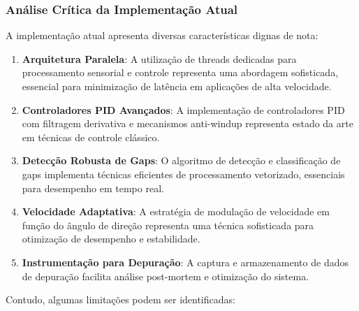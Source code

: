 \subsubsection{Análise Crítica da Implementação Atual}

A implementação atual apresenta diversas características dignas de nota:

\begin{enumerate}
    \item \textbf{Arquitetura Paralela}: A utilização de threads dedicadas para processamento sensorial e controle representa uma abordagem sofisticada, essencial para minimização de latência em aplicações de alta velocidade.

    \item \textbf{Controladores PID Avançados}: A implementação de controladores PID com filtragem derivativa e mecanismos anti-windup representa estado da arte em técnicas de controle clássico.

    \item \textbf{Detecção Robusta de Gaps}: O algoritmo de detecção e classificação de gaps implementa técnicas eficientes de processamento vetorizado, essenciais para desempenho em tempo real.

    \item \textbf{Velocidade Adaptativa}: A estratégia de modulação de velocidade em função do ângulo de direção representa uma técnica sofisticada para otimização de desempenho e estabilidade.

    \item \textbf{Instrumentação para Depuração}: A captura e armazenamento de dados de depuração facilita análise post-mortem e otimização do sistema.
\end{enumerate}

Contudo, algumas limitações podem ser identificadas:

